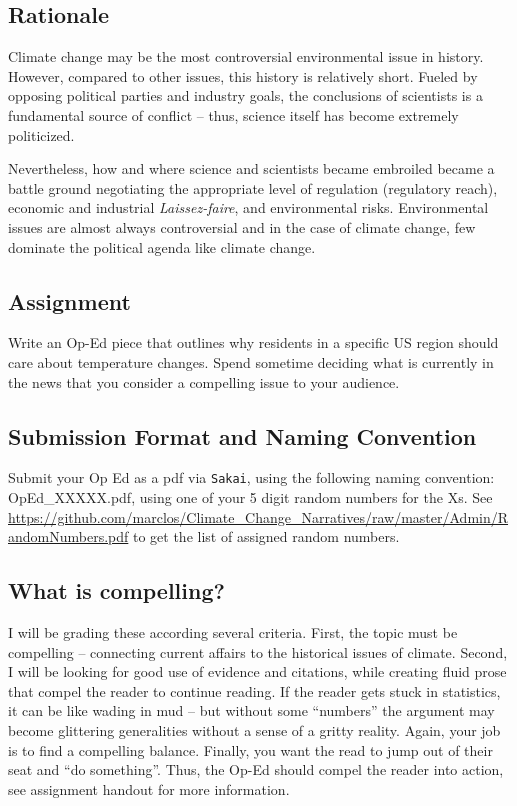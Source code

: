
\subsection{Rationale}

Climate change may be the most controversial environmental issue in history. However, compared to other issues, this history is relatively short. Fueled by opposing political parties and industry goals, the conclusions of scientists is a fundamental source of conflict -- thus, science itself has become extremely politicized. 

Nevertheless, how and where science and scientists became embroiled became a battle ground negotiating the appropriate level of regulation (regulatory reach), economic and industrial \textit{Laissez-faire}, and environmental risks. Environmental issues are almost always controversial and in the case of climate change, few dominate the political agenda like climate change. 

\subsection{Assignment}

Write an Op-Ed piece that outlines why residents in a specific US region should care about temperature changes. Spend sometime deciding what is currently in the news that you consider a compelling issue to your audience.

\subsection{Submission Format and Naming Convention}

Submit your Op Ed as a pdf via \texttt{Sakai}, using the following naming convention: OpEd\_XXXXX.pdf, using one of your 5 digit random numbers for the Xs. See \url{https://github.com/marclos/Climate_Change_Narratives/raw/master/Admin/RandomNumbers.pdf} to get the list of assigned random numbers. 

\subsection{What is compelling?}

I will be grading these according several criteria. First, the topic must be compelling -- connecting current affairs to the historical issues of climate. Second, I will be looking for good use of evidence and citations, while creating fluid prose that compel the reader to continue reading. If the reader gets stuck in statistics, it can be like wading in mud -- but without some ``numbers'' the argument may become glittering generalities without a sense of a gritty reality. Again, your job is to find a compelling balance. Finally, you want the read to jump out of their seat and ``do something''. Thus, the Op-Ed should compel the reader into action, see assignment handout for more information.





